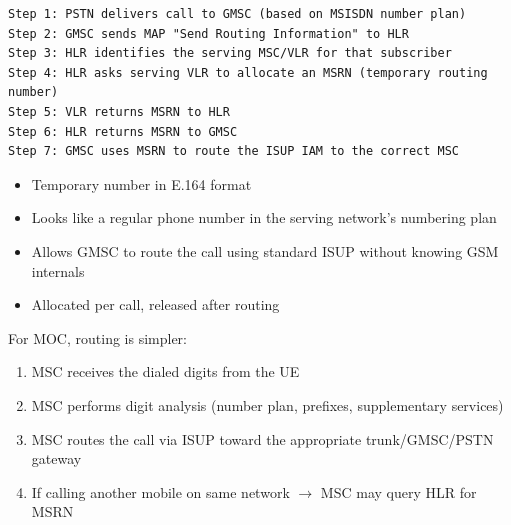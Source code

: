
\def\CNcodelang{}

\begin{CNplaincode}
\begin{Verbatim}
Step 1: PSTN delivers call to GMSC (based on MSISDN number plan)
Step 2: GMSC sends MAP "Send Routing Information" to HLR
Step 3: HLR identifies the serving MSC/VLR for that subscriber
Step 4: HLR asks serving VLR to allocate an MSRN (temporary routing number)
Step 5: VLR returns MSRN to HLR
Step 6: HLR returns MSRN to GMSC
Step 7: GMSC uses MSRN to route the ISUP IAM to the correct MSC
\end{Verbatim}
\end{CNplaincode}


\begin{itemize}
\tightlist
\item
  Temporary number in E.164 format
\item
  Looks like a regular phone number in the serving network’s numbering plan
\item
  Allows GMSC to route the call using standard ISUP without knowing GSM internals
\item
  Allocated per call, released after routing
\end{itemize}


For MOC, routing is simpler:

\begin{enumerate}
\def\labelenumi{\arabic{enumi}.}
\tightlist
\item
  MSC receives the dialed digits from the UE
\item
  MSC performs digit analysis (number plan, prefixes, supplementary services)
\item
  MSC routes the call via ISUP toward the appropriate trunk/\allowbreak{}GMSC/\allowbreak{}PSTN gateway
\item
  If calling another mobile on same network \ensuremath{\to} MSC may query HLR for MSRN
\end{enumerate}



\CNchained{}

